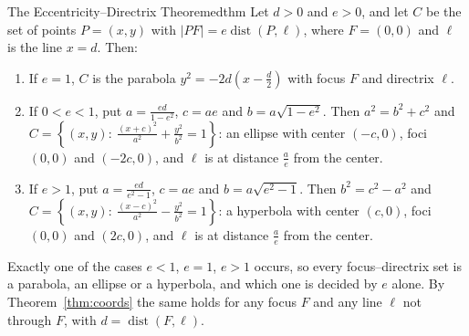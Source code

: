 \documentclass[11pt]{article}
\begin{document}
\begin{thm}{The Eccentricity--Directrix Theorem}{edthm}
Let $d>0$ and $e>0$, and let $C$ be the set of points $P=(x,y)$ with $\lvert PF\rvert=e\operatorname{dist}(P,\ell)$, where $F=(0,0)$ and $\ell$ is the line $x=d$. Then:
\begin{enumerate}[label=(\arabic*)]
  \item If $e=1$, $C$ is the parabola $y^2=-2d\left(x-\frac d2\right)$ with focus $F$ and directrix $\ell$.
  \item If $0<e<1$, put $a=\frac{ed}{1-e^2}$, $c=ae$ and $b=a\sqrt{1-e^2}$. Then $a^2=b^2+c^2$ and $C=\left\{(x,y):\ \frac{(x+c)^2}{a^2}+\frac{y^2}{b^2}=1\right\}$: an ellipse with center $(-c,0)$, foci $(0,0)$ and $(-2c,0)$, and $\ell$ is at distance $\frac ae$ from the center.
  \item If $e>1$, put $a=\frac{ed}{e^2-1}$, $c=ae$ and $b=a\sqrt{e^2-1}$. Then $b^2=c^2-a^2$ and $C=\left\{(x,y):\ \frac{(x-c)^2}{a^2}-\frac{y^2}{b^2}=1\right\}$: a hyperbola with center $(c,0)$, foci $(0,0)$ and $(2c,0)$, and $\ell$ is at distance $\frac ae$ from the center.
\end{enumerate}
Exactly one of the cases $e<1$, $e=1$, $e>1$ occurs, so every focus--directrix set is a parabola, an ellipse or a hyperbola, and which one is decided by $e$ alone. By Theorem~\ref{thm:coords} the same holds for any focus $F$ and any line $\ell$ not through $F$, with $d=\operatorname{dist}(F,\ell)$.
\end{thm}
\end{document}
